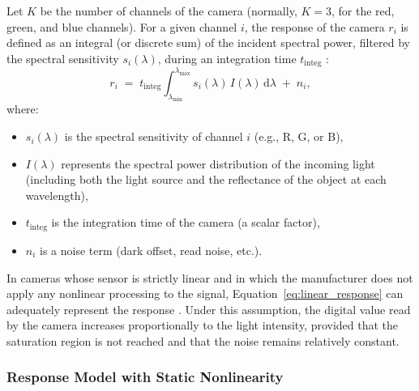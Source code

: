 Let $K$ be the number of channels of the camera (normally, $K=3$, for the red, green, and blue channels). For a given channel $i$, the response of the camera $r_{i}$ is defined as an integral (or discrete sum) of the incident spectral power, filtered by the spectral sensitivity $s_{i}(\lambda)$, during an integration time $t_{\mathrm{integ}}$ \cite{Vora1997DigitalModels,Uttner2006SpectralCameras}:
\begin{equation}
r_{i} \;=\; t_{\mathrm{integ}} \int_{\lambda_{\min}}^{\lambda_{\max}} s_{i}(\lambda)\,I(\lambda)\,\mathrm{d}\lambda \;+\; n_{i},
\label{eq:linear_response}
\end{equation}
where:
\begin{itemize}
    \item $s_{i}(\lambda)$ is the spectral sensitivity of channel $i$ (e.g., R, G, or B),
    \item $I(\lambda)$ represents the spectral power distribution of the incoming light (including both the light source and the reflectance of the object at each wavelength),
    \item $t_{\mathrm{integ}}$ is the integration time of the camera (a scalar factor),
    \item $n_{i}$ is a noise term (dark offset, read noise, etc.).
\end{itemize}

In cameras whose sensor is strictly linear and in which the manufacturer does not apply any nonlinear processing to the signal, Equation~\eqref{eq:linear_response} can adequately represent the response \cite{Vora1997DigitalModels}. Under this assumption, the digital value read by the camera increases proportionally to the light intensity, provided that the saturation region is not reached and that the noise remains relatively constant.

\subsubsection{Response Model with Static Nonlinearity}

